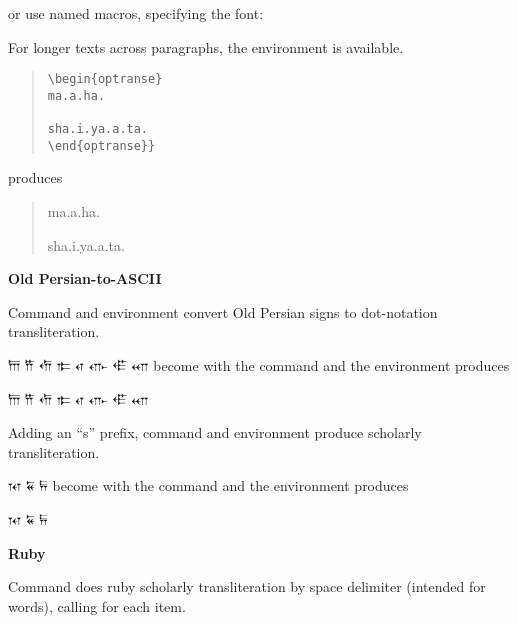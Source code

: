 \documentclass{article}
\begin{document}
\begin{quotation}

\end{quotation}
or use named macros, specifying the font:


\begin{quotation}


\end{quotation}

\bigskip
For longer texts across paragraphs, the  environment is available.

\begin{quotation}
\noindent\begin{verbatim}
\begin{optranse}
ma.a.ha.

sha.i.ya.a.ta.
\end{optranse}}
\end{verbatim}
\end{quotation}
produces

\begin{quotation}
\begin{optranse}
ma.a.ha.

sha.i.ya.a.ta.
\end{optranse}
\end{quotation}

\bigskip
\textbf{Old Persian-to-\textsc{ASCII}}

Command \cs{\optransrev} and environment  convert Old Persian signs to dot-notation transliteration.

{\opfont
𐎠
𐎡
𐎢
𐎣
𐎤
𐎥
𐎦
𐎧
}
become 
with the command
and the environment produces
\begin{optranserev}
𐎠
𐎡
𐎢
𐎣
𐎤
𐎥
𐎦
𐎧
\end{optranserev}

\bigskip
Adding an ``s'' prefix, command \cs{\soptransrev} and environment  produce scholarly transliteration.

{\opfont
𐎰
𐏁
𐏂
}
become 
with the command
and the environment produces
\begin{soptranserev}
𐎰
𐏁
𐏂
\end{soptranserev}


\bigskip\textbf{Ruby}

Command \cs{\soprubyw} does ruby scholarly transliteration by space delimiter (intended for words), calling \cs{\sopmaprubyw} for each item.
\end{document}
